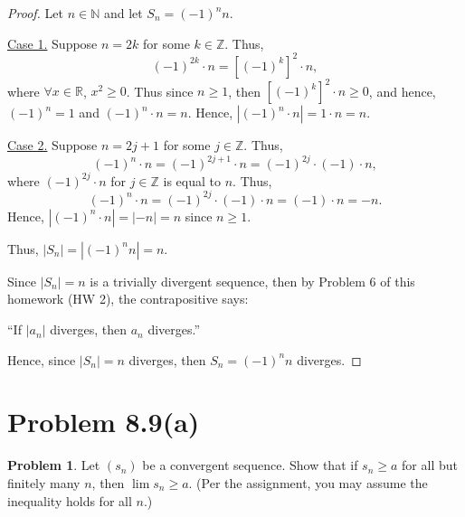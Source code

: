 \documentclass{article}
\theoremstyle{definition}
\newtheorem*{problem}{Problem}
\begin{document}
\begin{proof}
Let $n \in \mathbb{N}$ and let $S_n = (-1)^n n$.

\medskip
\underline{Case 1.} Suppose $n = 2k$ for some $k \in \mathbb{Z}$. Thus,
\[
(-1)^{2k} \cdot n = \left[(-1)^k\right]^2 \cdot n,
\]
where $\forall x \in \mathbb{R}$, $x^2 \geq 0$. Thus since $n \geq 1$, then $\left[(-1)^k\right]^2 \cdot n \geq 0$, and hence, $(-1)^n = 1$ and $(-1)^n \cdot n = n$. Hence, $|(-1)^n \cdot n| = 1 \cdot n = n$.

\medskip
\underline{Case 2.} Suppose $n = 2j + 1$ for some $j \in \mathbb{Z}$. Thus,
\[
(-1)^n \cdot n = (-1)^{2j+1} \cdot n = (-1)^{2j} \cdot (-1) \cdot n,
\]
where $(-1)^{2j} \cdot n$ for $j \in \mathbb{Z}$ is equal to $n$. Thus,
\[
(-1)^n \cdot n = (-1)^{2j} \cdot (-1) \cdot n = (-1) \cdot n = -n.
\]
Hence, $|(-1)^n \cdot n| = |-n| = n$ since $n \geq 1$.

\medskip
Thus, $|S_n| = |(-1)^n n| = n$.

Since $|S_n| = n$ is a trivially divergent sequence, then by Problem 6 of this homework (HW 2), the contrapositive says:
\begin{center}
``If $|a_n|$ diverges, then $a_n$ diverges.''
\end{center}
Hence, since $|S_n| = n$ diverges, then $S_n = (-1)^n n$ diverges.
\end{proof}

\clearpage
\section{Problem 8.9(a)}

\begin{problem}
Let $(s_n)$ be a convergent sequence. Show that if $s_n \geq a$ for all but finitely many $n$, then $\lim s_n \geq a$. (Per the assignment, you may assume the inequality holds for all $n$.)
\end{problem}

%
\end{document}
